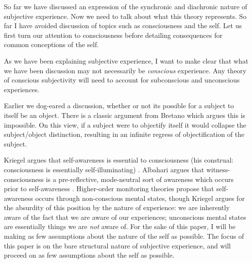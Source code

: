 \documentclass[leqno]{article}
\begin{document}
	So far we have discussed an expression of the synchronic and diachronic nature
	of subjective experience. Now we need to talk about what this theory represents.
	So far I have avoided discussion of topics such as consciousness and the self.
	Let us first turn our attention to consciousness before detailing consequences
	for common conceptions of the self.

	As we have been explaining subjective experience, I want to make clear that
	what we have been discussion may not necessarily be \emph{conscious} experience.
	Any theory of conscious subjectivity will need to account for subconscious and
	unconscious experiences.

	Earlier we dog-eared a discussion, whether or not its possible for a subject to
	itself be an object. There is a classic argument from Bretano which argues
	this is impossible. On this view, if a subject were to objectify itself it
	would collapse the subject/object distinction, resulting in an infinite regress
	of objectification of the subject.

	Kriegel argues that self-awareness is essential to consciousness (his
	construal: consciousness is essentially self-illuminating) \autocite{kriegel2003}.
	Albahari argues that witness-consciousness is a pre-reflective, mode-neutral sort
	of awareness which occurs prior to self-awareness \autocite{albahari2009}. Higher-order
	monitoring theories propose that self-awareness occurs through non-conscious mental
	states, though Kriegel argues for the absurdity of this position by the nature
	of experience: we are inherently aware of the fact that we are aware of our experiences;
	unconscious mental states are essentially things we are \emph{not} aware of.
	For the sake of this paper, I will be making as few assumptions about the nature
	of the self as possible. The focus of this paper is on the bare structural
	nature of subjective experience, and will proceed on as few assumptions about the
	self as possible.
\end{document}

